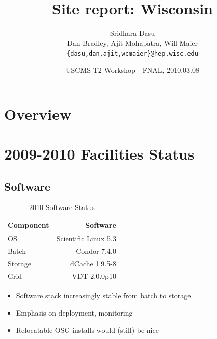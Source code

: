 \documentclass{beamer}
\title{Site report: Wisconsin}
\author[Maier]{
	Sridhara Dasu \\
	Dan Bradley, Ajit Mohapatra, Will Maier
	{\tt \{dasu,dan,ajit,wcmaier\}@hep.wisc.edu}}
\institute[Wisconsin]{University of Wisconsin - High Energy Physics}
\date[2010.03.08]{USCMS T2 Workshop - FNAL, 2010.03.08}
\begin{document}

\begin{frame}
	\titlepage
\end{frame}

\section{Overview}
\begin{frame}
	\tableofcontents
\end{frame}

\section{2009-2010 Facilities Status}
\subsection{Software}
\begin{frame}
\begin{table}
\begin{tabular}{lr}
	\toprule
	Component	 	&	 Software \\
	\midrule
	OS					&	 Scientific Linux 5.3 \\
	Batch			 	&	 Condor 7.4.0 \\
	Storage		 	&	 dCache 1.9.5-8 \\
	Grid				&	 VDT 2.0.0p10 \\
	\bottomrule
\end{tabular}
\caption{2010 Software Status}
\label{2010_software_status}
\end{table}

\begin{itemize}
	\item Software stack increasingly stable from batch to storage
	\item Emphasis on deployment, monitoring
	\item Relocatable OSG installs would (still) be nice
\end{itemize}

\end{frame}
\end{document}
